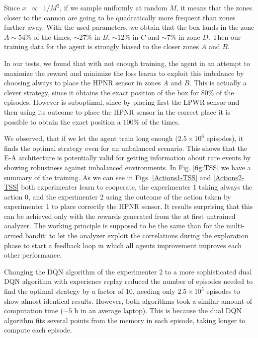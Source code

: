 \documentclass[11pt,a4paper,twoside]{report}
\newcommand{\+}{\textnormal{+} }
\theoremstyle{definition}
\numberwithin{equation}{chapter}
\begin{document}
Since $x\;\;\propto \;\;1/M^2$, if we sample uniformly at random $M$, it means
that the zones closer to the cannon are going to be quadratically more frequent
than zones further away. With the used parameters, we obtain that the box lands
in the zone $A\sim54\%$ of the times, $\sim27\%$ in $B$, $\sim 12\%$ in
$C$ and $\sim7\%$ in zone $D$. Then our training data for the agent is 
strongly biased to the closer zones $A$ and $B$.

In our tests, we found that with not enough training, the agent in an attempt 
to maximize the reward and minimize the loss learns to exploit this imbalance by
choosing always to place the HPNR sensor in zones $A$ and $B$. This is actually
a clever strategy, since it obtains the exact position of the box for $80\%$ of
the episodes. However is suboptimal, since by placing first the LPWR sensor and
then using its outcome to place the HPNR sensor in the correct place it is
possible to obtain the exact position a $100\%$ of the times.

We observed, that if we let the agent train long enough ($2.5\times 10^6$
episodes), it finds the optimal strategy even for an unbalanced scenario. This
shows that the E-A architecture is potentially valid for getting information
about rare events by showing robustness against imbalanced environments. In Fig.
\ref{fig:TSS} we have a summary of the training. As we can see in Figs.
\ref{Actions1-TSS} and \ref{Actions2-TSS} both experimenter learn to cooperate,
the experimenter 1 taking always the action 0, and the experimenter 2 using the
outcome of the action taken by experimenter 1 to place correctly the HPNR
sensor. It results surprising that this can be achieved only with the rewards
generated from the at first untrained analyzer. The working principle is
supposed to be the same than for the multi-armed bandit: to let the analyzer
exploit the correlations during the exploration phase to start a feedback loop
in which all agents improvement improves each other performance.

Changing the DQN algorithm of the experimenter 2 to a more sophisticated dual
DQN algorithm with experience replay reduced the number of episodes needed to
find the optimal strategy by a factor of $10$, needing only $2.5\times10^5$
episodes to show almost identical results. However, both algorithms took a
similar amount of computation time ($\sim 5$ h in an average laptop). This is
because the dual DQN algorithm fits several points from the memory in each
episode, taking longer to compute each episode.
\end{document}
